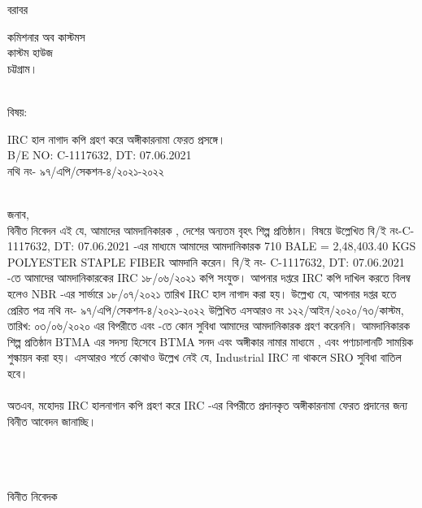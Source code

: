 \documentclass[12pt]{article}
\newcommand{\beno}{C-1117632}
\newcommand{\bedt}{07.06.2021}
\newcommand{\pkg}{710 BALE = 2,48,403.40 KGS}
\newcommand{\good}{POLYESTER STAPLE FIBER}
\newcommand{\impn}{\jsml}
\begin{document}
\noindent
বরাবর
\\
\begin{minipage}[t]{0.06\linewidth}
\hspace{1em}
\end{minipage}
\begin{minipage}[t]{0.94\linewidth}
কমিশনার অব কাস্টমস
\\
কাস্টম হাউজ
\\
চট্টগ্রাম।
\\
\\
\end{minipage}
\begin{minipage}[t]{0.06\linewidth}
বিষয়:
\end{minipage}
\begin{minipage}[t]{0.94\linewidth}
IRC হাল নাগাদ কপি গ্রহণ করে অঙ্গীকারনামা ফেরত প্রসঙ্গে।
\\
B/E NO: {\beno}, DT: {\bedt}
\\
নথি নং- ৯৭/এপি/সেকশন-৪/২০২১-২০২২
\\
\\
\end{minipage}
জনাব,
\\
\hspace*{2.7em}
বিনীত নিবেদন এই যে, আমাদের আমদানিকারক {\impn},
দেশের অন্যতম বৃহৎ শিল্প প্রতিষ্ঠান।
বিষয়ে উল্লেখিত বি/ই নং-{\beno}, DT: {\bedt} -এর মাধ্যমে
আমাদের আমদানিকারক {\pkg} {\good}
আমদানি করেন। বি/ই নং- {\beno}, DT: {\bedt} -তে
আমাদের আমদানিকারকের
IRC ১৮/০৬/২০২১ কপি সংযুক্ত।
আপনার দপ্তরে IRC কপি দাখিল
করতে বিলম্ব হলেও NBR -এর
সার্ভারে ১৮/০৭/২০২১ তারিখ
IRC হাল নাগাদ করা হয়।
উল্লেখ্য যে, আপনার দপ্তর হতে প্রেরিত
পত্র
নথি নং- ৯৭/এপি/সেকশন-৪/২০২১-২০২২
উল্লিখিত এসআরও নং ১২২/আইন/২০২০/৭৩/কাস্টম,
তারিখ: ০৩/০৬/২০২০ এর বিপরীতে এবং
{\cpcfzo} -তে কোন সুবিধা আমাদের
আমদানিকারক গ্রহণ করেননি।
আমদানিকারক শিল্প প্রতিষ্ঠান BTMA
এর সদস্য হিসেবে BTMA সনদ এবং
অঙ্গীকার নামার মাধ্যমে {\srootz}, {\srootzd}
এবং {\cpcofs}
পণ্যচালানটি সাময়িক শুল্কায়ন করা হয়।
এসআরও শর্তে কোথাও উল্লেখ নেই যে,
Industrial IRC না থাকলে SRO সুবিধা
বাতিল হবে।
\\
\\
অতএব, মহোদয় IRC হালনাগান কপি গ্রহণ করে
IRC -এর বিপরীতে প্রদানকৃত অঙ্গীকারনামা ফেরত
প্রদানের জন্য বিনীত আবেদন জানাচ্ছি।
\\
\\
\\
\\
\begin{minipage}[t]{0.55\linewidth}
\hspace{1em}
\end{minipage}
\begin{minipage}[t]{0.45\linewidth}
বিনীত নিবেদক
\\
\\
\\
\\
\\
{\cnfn}
\end{minipage}
\thispagestyle{laststyle}
\end{document}
